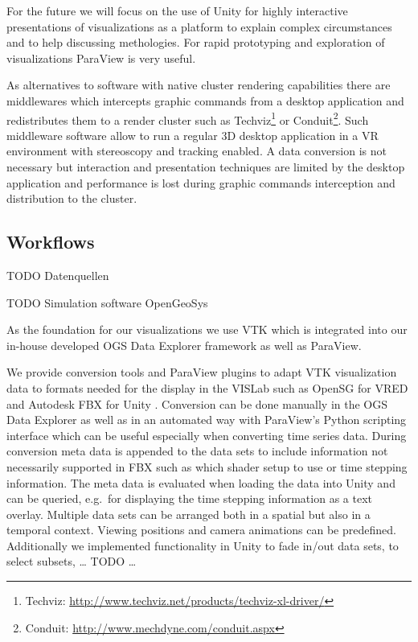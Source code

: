 For the future we will focus on the use of Unity for highly interactive
presentations of visualizations as a platform to explain complex circumstances
and to help discussing methologies. For rapid prototyping and exploration of
visualizations ParaView is very useful.

As alternatives to software with native cluster rendering capabilities there are
middlewares which intercepts graphic commands from a desktop application and
redistributes them to a render cluster such as
Techviz\footnote{Techviz: \url{http://www.techviz.net/products/techviz-xl-driver/}} or
Conduit\footnote{Conduit: \url{http://www.mechdyne.com/conduit.aspx}}. Such
middleware software allow to run a regular 3D desktop application in a VR
environment with stereoscopy and tracking enabled. A data conversion is not
necessary but interaction and presentation techniques are limited by the desktop
application and performance is lost during graphic commands interception and
distribution to the cluster.

\subsection{Workflows}
\label{workflows}

TODO Datenquellen

TODO Simulation software OpenGeoSys \cite{kolditz:ogs}

As the foundation for our visualizations we use VTK which is
integrated into our in-house developed OGS Data Explorer framework
\cite{rink:eesenvirvis} as well as ParaView.

We provide conversion tools and ParaView plugins to adapt VTK
visualization data to formats needed for the display in the VISLab such
as OpenSG for VRED \cite{bilke:vtkosgconverter} and Autodesk FBX for
Unity \cite{bilke:vtkfbxconverter}. Conversion can be done manually in the
OGS Data Explorer as well as in an automated way with ParaView's Python
scripting interface which can be useful especially when converting time
series data. During conversion meta data is appended to the data sets to
include information not necessarily supported in FBX such as which
shader setup to use or time stepping information. The meta data is
evaluated when loading the data into Unity and can be queried, e.g.~for
displaying the time stepping information as a text overlay. Multiple
data sets can be arranged both in a spatial but also in a temporal
context. Viewing positions and camera animations can be predefined.
Additionally we implemented functionality in Unity to fade in/out data
sets, to select subsets, \ldots{} TODO \ldots{}

